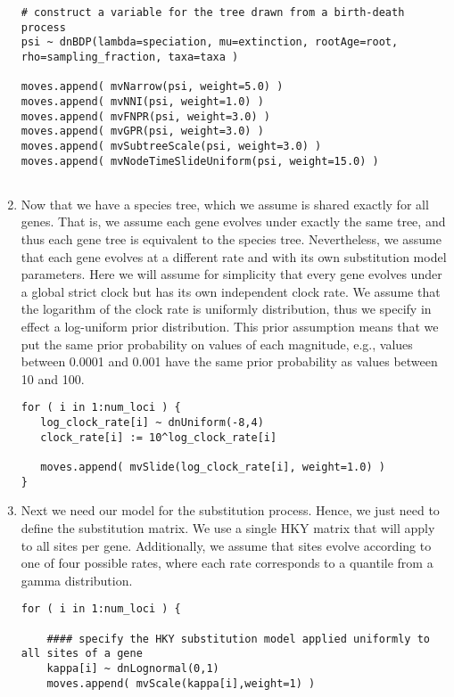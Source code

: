 \begin{enumerate}
{\begin{snugshade*}
\begin{lstlisting}
# construct a variable for the tree drawn from a birth-death process
psi ~ dnBDP(lambda=speciation, mu=extinction, rootAge=root, rho=sampling_fraction, taxa=taxa )

moves.append( mvNarrow(psi, weight=5.0) )
moves.append( mvNNI(psi, weight=1.0) )
moves.append( mvFNPR(psi, weight=3.0) )
moves.append( mvGPR(psi, weight=3.0) )
moves.append( mvSubtreeScale(psi, weight=3.0) )
moves.append( mvNodeTimeSlideUniform(psi, weight=15.0) )


\end{lstlisting}
\end{snugshade*}}
\item Now that we have a species tree, which we assume is shared exactly for all genes.
That is, we assume each gene evolves under exactly the same tree, and thus each gene tree is equivalent to the species tree.
Nevertheless, we assume that each gene evolves at a different rate and with its own substitution model parameters.
Here we will assume for simplicity that every gene evolves under a global strict clock but has its own independent clock rate.
We assume that the logarithm of the clock rate is uniformly distribution, thus we specify in effect a log-uniform prior distribution.
This prior assumption means that we put the same prior probability on values of each magnitude, e.g., values between 0.0001 and 0.001 have the same prior probability as values between 10 and 100.
{\tt \begin{snugshade*}
\begin{lstlisting}
for ( i in 1:num_loci ) { 
   log_clock_rate[i] ~ dnUniform(-8,4)
   clock_rate[i] := 10^log_clock_rate[i]
   
   moves.append( mvSlide(log_clock_rate[i], weight=1.0) )
}
\end{lstlisting}
\end{snugshade*}}

\item Next we need our model for the substitution process. 
Hence, we just need to define the substitution matrix. 
We use a single HKY matrix that will apply to all sites per gene.
Additionally, we assume that sites evolve according to one of four possible rates, where each rate corresponds to a quantile from a gamma distribution.
{\tt \begin{snugshade*}
\begin{lstlisting}
for ( i in 1:num_loci ) {

    #### specify the HKY substitution model applied uniformly to all sites of a gene
    kappa[i] ~ dnLognormal(0,1)
    moves.append( mvScale(kappa[i],weight=1) )


\end{lstlisting}
\end{snugshade*}}
\end{enumerate}
